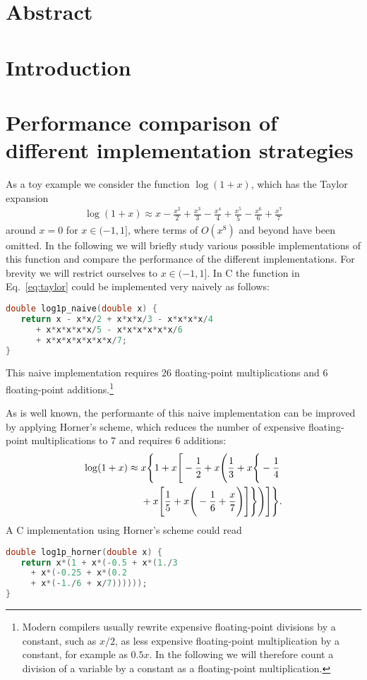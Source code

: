 \documentclass[10pt,DIV16,twocolumn]{scrartcl}
\title{\mytitle}
\author{\myauthor}
\affil{Fachbereich Energie und Biotechnologie, Hochschule Flensburg,\\ Kanzleistra{\ss}e 91--93, 24943 Flensburg, Germany}
\date{\today}
\begin{document}
\maketitle

\section*{Abstract}

\section{Introduction}

\cite{polylogarithm}

\section{Performance comparison of different implementation strategies}

As a toy example we consider the function $\log(1+x)$, which has the
Taylor expansion
%
\begin{align}
  \log(1+x) \approx x - \frac{x^2}{2} + \frac{x^3}{3} - \frac{x^4}{4} + \frac{x^5}{5} - \frac{x^6}{6} + \frac{x^7}{7}
  \label{eq:taylor}
\end{align}
%
around $x=0$ for $x\in(-1,1]$, where terms of $O(x^8)$ and beyond have
been omitted.  In the following we will briefly study various possible
implementations of this function and compare the performance of the
different implementations.  For brevity we will restrict ourselves to
$x\in(-1,1]$.  In C the function in Eq.~\eqref{eq:taylor} could be
implemented very naively as follows:
%
\begin{lstlisting}[language=C]
double log1p_naive(double x) {
   return x - x*x/2 + x*x*x/3 - x*x*x*x/4
      + x*x*x*x*x/5 - x*x*x*x*x*x/6
      + x*x*x*x*x*x*x/7;
}
\end{lstlisting}
%
This naive implementation requires 26 floating-point multiplications
and 6 floating-point additions.\footnote{Modern compilers usually
  rewrite expensive floating-point divisions by a constant, such as
  $x/2$, as less expensive floating-point multiplication by a
  constant, for example as $0.5x$.  In the following we will therefore
  count a division of a variable by a constant as a floating-point
  multiplication.}

As is well known, the performante of this naive implementation can be
improved by applying Horner's scheme, which reduces the number of
expensive floating-point multiplications to 7 and requires 6
additions:
%
\begin{align}
  \log(1+x) \approx{}& x \Bigg\{1 + x \Bigg[-\frac{1}{2} + x \Bigg(\frac{1}{3} + x \Bigg\{-\frac{1}{4}  \notag \\
  &+ x \Bigg[\frac{1}{5} + x\Bigg(-\frac{1}{6} + \frac{x}{7}\Bigg)\Bigg]\Bigg\}\Bigg)\Bigg]\Bigg\}.
  \label{eq:horner}
\end{align}
%
A C implementation using Horner's scheme could read
%
\begin{lstlisting}[language=C]
double log1p_horner(double x) {
   return x*(1 + x*(-0.5 + x*(1./3
     + x*(-0.25 + x*(0.2
     + x*(-1./6 + x/7))))));
}
\end{lstlisting}
\end{document}
